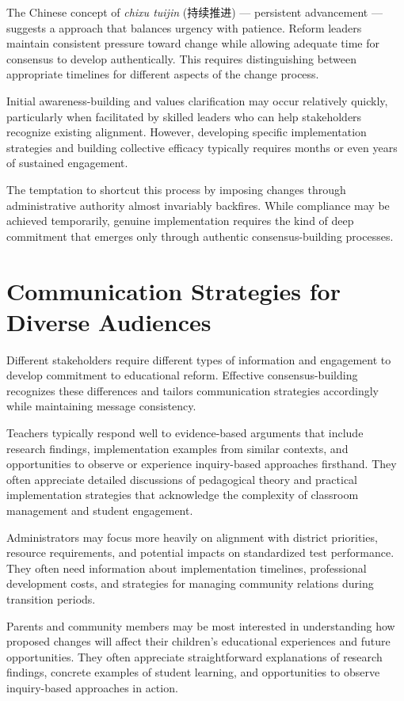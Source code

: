 \documentclass[
  Letterpaper,
]{scrbook}
\begin{document}
The Chinese concept of \emph{chixu tuijin} (持续推进) --- persistent
advancement --- suggests a approach that balances urgency with patience.
Reform leaders maintain consistent pressure toward change while allowing
adequate time for consensus to develop authentically. This requires
distinguishing between appropriate timelines for different aspects of
the change process.

Initial awareness-building and values clarification may occur relatively
quickly, particularly when facilitated by skilled leaders who can help
stakeholders recognize existing alignment. However, developing specific
implementation strategies and building collective efficacy typically
requires months or even years of sustained engagement.

The temptation to shortcut this process by imposing changes through
administrative authority almost invariably backfires. While compliance
may be achieved temporarily, genuine implementation requires the kind of
deep commitment that emerges only through authentic consensus-building
processes.

\section{Communication Strategies for Diverse
Audiences}\label{communication-strategies-for-diverse-audiences}

Different stakeholders require different types of information and
engagement to develop commitment to educational reform. Effective
consensus-building recognizes these differences and tailors
communication strategies accordingly while maintaining message
consistency.

Teachers typically respond well to evidence-based arguments that include
research findings, implementation examples from similar contexts, and
opportunities to observe or experience inquiry-based approaches
firsthand. They often appreciate detailed discussions of pedagogical
theory and practical implementation strategies that acknowledge the
complexity of classroom management and student engagement.

Administrators may focus more heavily on alignment with district
priorities, resource requirements, and potential impacts on standardized
test performance. They often need information about implementation
timelines, professional development costs, and strategies for managing
community relations during transition periods.

Parents and community members may be most interested in understanding
how proposed changes will affect their children's educational
experiences and future opportunities. They often appreciate
straightforward explanations of research findings, concrete examples of
student learning, and opportunities to observe inquiry-based approaches
in action.
\end{document}
